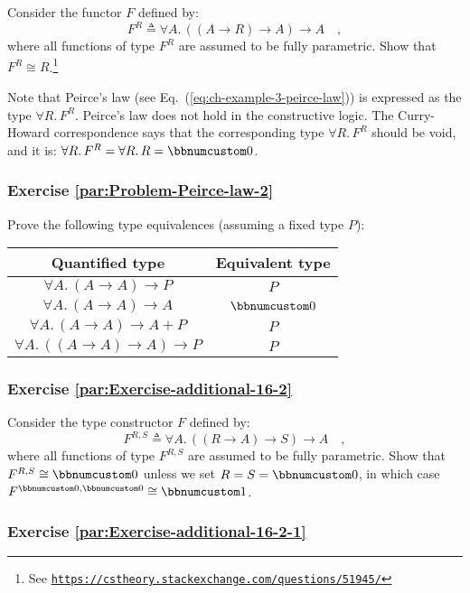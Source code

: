 Consider the functor $F$ defined by:
\[
F^{R}\triangleq\forall A.\,((A\rightarrow R)\rightarrow A)\rightarrow A\quad,
\]
where all functions of type $F^{R}$ are assumed to be fully parametric.
Show that $F^{R}\cong R$.\footnote{See \texttt{\href{https://cstheory.stackexchange.com/questions/51945/}{https://cstheory.stackexchange.com/questions/51945/}}}

Note that Peirce\textsf{'}s law (see Eq.~(\ref{eq:ch-example-3-peirce-law}))
is expressed as the type $\forall R.\,F^{R}$. Peirce\textsf{'}s law does not
hold in the constructive logic. The Curry-Howard correspondence says
that the corresponding type $\forall R.\,F^{R}$ should be void, and
it is: $\forall R.\,F^{R}=\forall R.\,R=\bbnum 0$. 

\subsubsection{Exercise \label{par:Problem-Peirce-law-2}\ref{par:Problem-Peirce-law-2}}

Prove the following type equivalences (assuming a fixed type $P$):

\begin{tabular}{|c|c|}
\hline 
\textbf{\footnotesize{}Quantified type} & \textbf{\footnotesize{}Equivalent type}\tabularnewline
\hline 
\hline 
$\forall A.\,(A\rightarrow A)\rightarrow P$ & $P$\tabularnewline
\hline 
$\forall A.\,(A\rightarrow A)\rightarrow A$ & $\bbnum 0$\tabularnewline
\hline 
$\forall A.\,(A\rightarrow A)\rightarrow A+P$ & $P$\tabularnewline
\hline 
$\forall A.\,((A\rightarrow A)\rightarrow A)\rightarrow P$ & $P$\tabularnewline
\hline 
\end{tabular}

\subsubsection{Exercise \label{par:Exercise-additional-16-2}\ref{par:Exercise-additional-16-2}}

Consider the type constructor $F$ defined by:
\[
F^{R,S}\triangleq\forall A.\,((R\rightarrow A)\rightarrow S)\rightarrow A\quad,
\]
where all functions of type $F^{R,S}$ are assumed to be fully parametric.
Show that $F^{R,S}\cong\bbnum 0$ unless we set $R=S=\bbnum 0$, in
which case $F^{\bbnum 0,\bbnum 0}\cong\bbnum 1$. 

\subsubsection{Exercise \label{par:Exercise-additional-16-2-1}\ref{par:Exercise-additional-16-2-1}}

